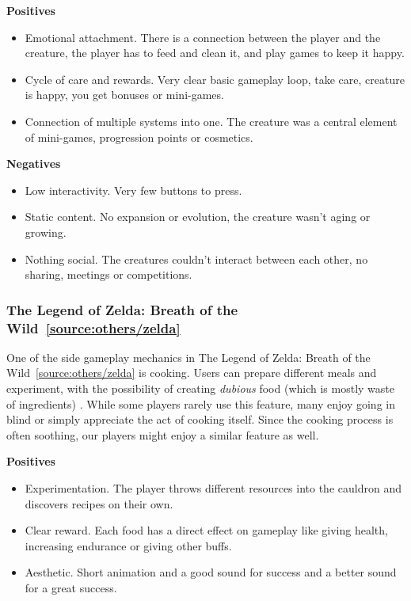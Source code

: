 \documentclass[11pt]{article}
\begin{document}
\textbf{Positives}
\begin{itemize}
    \item Emotional attachment. There is a connection between the player and the creature, the player has to feed and clean it, and play games to keep it happy.
    \item Cycle of care and rewards. Very clear basic gameplay loop, take care, creature is happy, you get bonuses or mini-games.
    \item Connection of multiple systems into one. The creature was a central element of mini-games, progression points or cosmetics.
\end{itemize}
\textbf{Negatives}
\begin{itemize}
    \item Low interactivity. Very few buttons to press.
    \item Static content. No expansion or evolution, the creature wasn't aging or growing.
    \item Nothing social. The creatures couldn't interact between each other, no sharing, meetings or competitions.
\end{itemize}

\subsubsection{The Legend of Zelda: Breath of the Wild~\ref{source:others/zelda}}
One of the side gameplay mechanics in The Legend of Zelda: Breath of the Wild~\ref{source:others/zelda} is cooking. Users can prepare different meals and experiment, with the possibility of creating \emph{dubious} food (which is mostly waste of ingredients) . While some players rarely use this feature, many enjoy going in blind or simply appreciate the act of cooking itself. Since the cooking process is often soothing, our players might enjoy a similar feature as well.

\newpage
\textbf{Positives}
\begin{itemize}
    \item Experimentation. The player throws different resources into the cauldron and discovers recipes on their own.
    \item Clear reward. Each food has a direct effect on gameplay like giving health, increasing endurance or giving other buffs.
    \item Aesthetic. Short animation and a good sound for success and a better sound for a great success.
\end{itemize}
\end{document}
